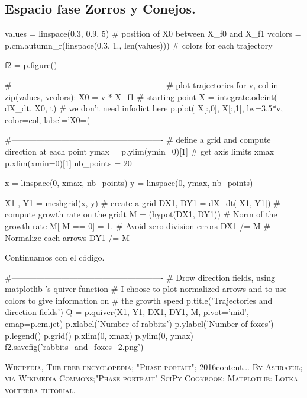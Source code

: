 \documentclass[12pt]{article}
\begin{document}
\subsection*{\textcolor{RubineRed}{Espacio fase Zorros y Conejos.}}
\begin{boxedverbatim}
values  = linspace(0.3, 0.9, 5)                          
# position of X0 between X_f0 and X_f1
vcolors = p.cm.autumn_r(linspace(0.3, 1., len(values)))  
# colors for each trajectory

f2 = p.figure()

#-------------------------------------------------------
# plot trajectories
for v, col in zip(values, vcolors):
    X0 = v * X_f1                               
    # starting point
    X = integrate.odeint( dX_dt, X0, t)         
    # we don't need infodict here
    p.plot( X[:,0], X[:,1], lw=3.5*v, color=col,
     label='X0=(%

#-------------------------------------------------------
# define a grid and compute direction at each point
ymax = p.ylim(ymin=0)[1]                        
# get axis limits
xmax = p.xlim(xmin=0)[1]
nb_points   = 20

x = linspace(0, xmax, nb_points)
y = linspace(0, ymax, nb_points)

X1 , Y1  = meshgrid(x, y)                       
# create a grid
DX1, DY1 = dX_dt([X1, Y1])                      
# compute growth rate on the gridt
M = (hypot(DX1, DY1))                           
# Norm of the growth rate
M[ M == 0] = 1.                                
# Avoid zero division errors
DX1 /= M                                        
# Normalize each arrows
DY1 /= M
\end{boxedverbatim}
\pagebreak

Continuamos con el código.\\

\begin{boxedverbatim}
#-------------------------------------------------------
# Drow direction fields, using matplotlib 's quiver function
# I choose to plot normalized arrows 
and to use colors to give information on
# the growth speed
p.title('Trajectories and direction fields')
Q = p.quiver(X1, Y1, DX1, DY1, M, pivot='mid', cmap=p.cm.jet)
p.xlabel('Number of rabbits')
p.ylabel('Number of foxes')
p.legend()
p.grid()
p.xlim(0, xmax)
p.ylim(0, ymax)
f2.savefig('rabbits_and_foxes_2.png')
\end{boxedverbatim}
\pagebreak
\begin{thebibliography}{X}
  \textsc{Wikipedia, The free encyclopedia; "Phase portait"; 2016}{content...}
  \textsc{By Ashraful; via Wikimedia Commons;"Phase portrait"}
  \textsc{SciPy Cookbook; Matplotlib: Lotka volterra tutorial.}
\end{thebibliography}
\end{document}
